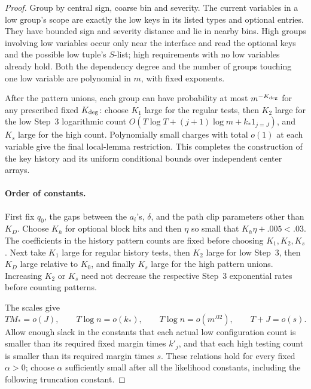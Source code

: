 \begin{proof}
Group by central sign, coarse bin and severity. The current variables
in a low group's scope are exactly the low keys in its listed types and
optional entries. They have bounded sign and severity distance and lie
in nearby bins. High groups involving low variables occur only near the
interface and read the optional keys and the possible low tuple's
\(S\)-list; high requirements with no low variables already hold.
Both the dependency degree and the number of groups touching one low
variable are polynomial in \(m\), with fixed exponents.

After the pattern unions, each group can have probability at most
\(m^{-K_{\rm deg}}\) for any prescribed fixed \(K_{\rm deg}\): choose
\(K_1\) large for the regular tests, then \(K_2\) large for the low
Step~3 logarithmic count
\(O(T\log T+(j+1)\log m+k_*1_{j=J})\), and \(K_s\) large for the
high count. Polynomially small charges with total \(o(1)\) at each
variable give the final local-lemma restriction. This completes the
construction of the key history and its uniform conditional bounds over
independent center arrays.

\paragraph{Order of constants.}
First fix \(q_0\), the gaps between the \(a_i\)'s, \(\delta\), and the
path clip parameters other than \(K_D\). Choose \(K_h\) for optional
block hits and then \(\eta\) so small that
\(K_h\eta+.005<.03\). The coefficients in the history pattern counts
are fixed before choosing \(K_1,K_2,K_s\). Next take \(K_1\) large for
regular history tests, then \(K_2\) large for low Step~3, then \(K_D\)
large relative to \(K_0\), and finally \(K_s\) large for the high
pattern unions. Increasing \(K_2\) or \(K_s\) need not decrease the
respective Step~3 exponential rates before counting patterns.

The scales give
\[
 TM_*=o(J),\qquad T\log n=o(k_*),\qquad
 T\log n=o(m^{.02}),\qquad T+J=o(s).
\]
Allow enough slack in the constants that each actual low configuration
count is smaller than its required fixed margin times \(k'_j\), and
that each high testing count is smaller than its required margin times
\(s\). These relations hold for every fixed \(\alpha>0\); choose
\(\alpha\) sufficiently small after all the likelihood constants,
including the following truncation constant.


\end{proof}
